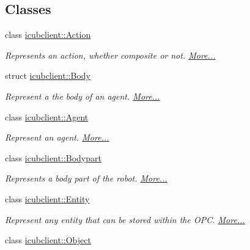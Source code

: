 \subsection*{Classes}
\begin{DoxyCompactItemize}
\item 
class \hyperlink{group__icubclient__representations_classicubclient_1_1Action}{icubclient\+::\+Action}
\begin{DoxyCompactList}\small\item\em Represents an action, whether composite or not.  \hyperlink{group__icubclient__representations_classicubclient_1_1Action}{More...}\end{DoxyCompactList}\item 
struct \hyperlink{group__icubclient__representations_structicubclient_1_1Body}{icubclient\+::\+Body}
\begin{DoxyCompactList}\small\item\em Represent a the body of an agent.  \hyperlink{group__icubclient__representations_structicubclient_1_1Body}{More...}\end{DoxyCompactList}\item 
class \hyperlink{group__icubclient__representations_classicubclient_1_1Agent}{icubclient\+::\+Agent}
\begin{DoxyCompactList}\small\item\em Represent an agent.  \hyperlink{group__icubclient__representations_classicubclient_1_1Agent}{More...}\end{DoxyCompactList}\item 
class \hyperlink{group__icubclient__representations_classicubclient_1_1Bodypart}{icubclient\+::\+Bodypart}
\begin{DoxyCompactList}\small\item\em Represents a body part of the robot.  \hyperlink{group__icubclient__representations_classicubclient_1_1Bodypart}{More...}\end{DoxyCompactList}\item 
class \hyperlink{group__icubclient__representations_classicubclient_1_1Entity}{icubclient\+::\+Entity}
\begin{DoxyCompactList}\small\item\em Represent any entity that can be stored within the O\+PC.  \hyperlink{group__icubclient__representations_classicubclient_1_1Entity}{More...}\end{DoxyCompactList}\item 
class \hyperlink{group__icubclient__representations_classicubclient_1_1Object}{icubclient\+::\+Object}

\end{DoxyCompactItemize}
